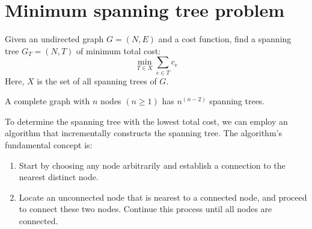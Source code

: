 \documentclass[12pt, a4paper]{report}
\begin{document}
    \section{Minimum spanning tree problem}
    Given an undirected graph $G=(N,E)$ and a cost function, find a spanning tree $G_T=(N,T)$ of minimum total cost: 
    \[\min_{T \in X} \sum_{e \in T}c_e\]
    Here, $X$ is the set of all spanning trees of $G$. 
    \begin{theorem}
        A complete graph with $n$ nodes $(n \geq 1)$ has $n^{(n-2)}$ spanning trees. 
    \end{theorem}
    To determine the spanning tree with the lowest total cost, we can employ an algorithm that incrementally constructs the spanning tree. 
    The algorithm's fundamental concept is:
    \begin{enumerate}
        \item Start by choosing any node arbitrarily and establish a connection to the nearest distinct node.
        \item Locate an unconnected node that is nearest to a connected node, and proceed to connect these two nodes. 
            Continue this process until all nodes are connected.
    \end{enumerate}
\end{document}
